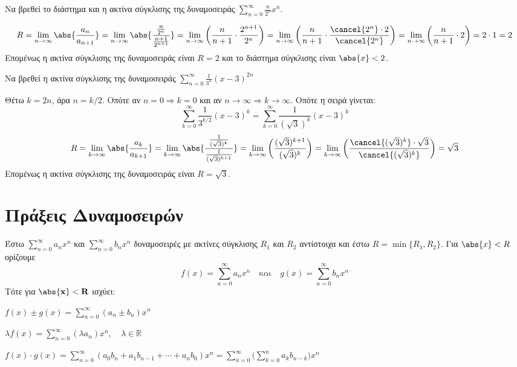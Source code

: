 \begin{example}
  Να βρεθεί το διάστημα και η ακτίνα σύγκλισης της δυναμοσειράς $ \sum_{n=0}^{\infty}
  \frac{n}{2^{n}} x^{n} $.
  \begin{solution}
    \[
      R= \lim_{n \to \infty} \abs{\frac{a_{n}}{a_{n+1}}} = 
      \lim_{n \to \infty} \abs{\frac{\frac{n}{2^{n}}}{\frac{n+1}{2^{n+1}}}} = 
      \lim_{n \to \infty} \left(\frac{n}{n+1} \cdot \frac{2^{n+1}}{2^{n}}\right) = 
      \lim_{n \to \infty} \left(\frac{n}{n+1} \cdot \frac{\cancel{2^{n}} \cdot
      2}{\cancel{2^{n}}} \right) = 
      \lim_{n \to \infty} \left(\frac{n}{n+1} \cdot 2 \right) = 2 \cdot 1 = 2
    \] 
    Επομένως η ακτίνα σύγκλισης της δυναμοσειράς είναι $ R=2 $ και το 
    διάστημα σύγκλισης είναι $ \abs{x} < 2 $.
  \end{solution}
\end{example}

\begin{example}
  Να βρεθεί η ακτίνα σύγκλισης της δυναμοσειράς 
  $ \sum_{n=0}^{\infty} \frac{1}{3^{n}} (x-3)^{2n} $ 
\end{example}
\begin{solution}
  Θέτω $ k=2n$, άρα $ n= k/2 $. Οπότε αν $ n=0 \Rightarrow k=0 $ και αν 
  $ n \to \infty \Rightarrow k \to \infty $. Οπότε η σειρά γίνεται:
  \[
    \sum_{k=0}^{\infty} \frac{1}{3^{k/2}} (x-3)^{k} = \sum_{k=0}^{\infty} 
    \frac{1}{(\sqrt{3}) ^{k}} (x-3)^{k}
  \] 
  \[
    R= \lim_{k \to \infty} \abs{\frac{a_{k}}{a_{k+1}}} = 
    \lim_{k \to \infty} \abs{\frac{\frac{1}{(\sqrt{3} )^{k}}}{\frac{1}{(\sqrt{3})^
    {k+1}}}} = 
    \lim_{k \to \infty} \left(\frac{(\sqrt{3})^{k+1}}{(\sqrt{3})^{k}}\right) = 
    \lim_{k \to \infty} \left(\frac{\cancel{(\sqrt{3})^{k}} \cdot 
      \sqrt{3}}{\cancel{(\sqrt{3})^{k}}} 
    \right) = \sqrt{3}
  \]
  Επομένως η ακτίνα σύγκλισης της δυναμοσειράς είναι $ R= \sqrt{3} $.
\end{solution}

\section*{Πράξεις Δυναμοσειρών}

Έστω $ \sum_{n=0}^{\infty} a_{n}x^{n} $ και $ \sum_{n=0}^{\infty} b_{n}x^{n} $ 
δυναμοσειρές με ακτίνες σύγκλισης $ R_{1} $ και $ R_{2} $ αντίστοιχα και έστω 
$ R = \min \{R_{1}, R_{2}\} $. Για $ \abs{x} < R $ ορίζουμε 
\[
  f(x) = \sum_{n=0}^{\infty} a_{n} x^{n} \quad \text{και} \quad g(x) =
  \sum_{n=0}^{\infty} b_{n} x^{n}
\] 
Τότε για $ \mathbf{\abs{x} < R} $ ισχύει:
\begin{myitemize}
  \item $ f(x)\pm g(x)= \sum_{n=0}^{\infty} (a_{n}\pm b_{n}) x^{n} $
  \item $ \lambda f(x) = \sum_{n=0}^{\infty} (\lambda a_{n}) x^{n}, \quad \lambda \in
    \mathbb{R} $
  \item $ f(x) \cdot g(x) = \sum_{n=0}^{\infty} (a_{0}b_{n} + a_{1}b_{n-1} + \cdots +
    a_{n} b_{0}) x^{n} = \sum_{n=0}^{\infty} \bigl(\sum_{k=0}^{n} a_{k} b_{n-k}\bigr) 
    x^{n} $
\end{myitemize}

